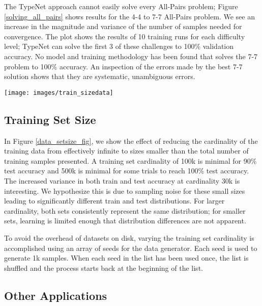 The TypeNet approach cannot easily solve every All-Pairs
problem; Figure \ref{solving_all_pairs} shows results for the 4-4 to 7-7 All-Pairs problem.
We see an increase in the magnitude and variance of the number of samples needed for convergence.  The plot shows the results of 10 training runs for each difficulty level; TypeNet can solve the first 3 of these challenges to 100\% validation accuracy.  No model and training methodology has been found that solves the 7-7 problem to 100\% accuracy.  An inspection of the errors made by the best 7-7 solution shows that they are systematic, unambiguous errors.


\begin{figure*}[!htb]
\centering
{}
  \texttt{[image: images/train\_sizedata]}
\endminipage\hfill
\caption{Training the TypeNet on 4-4 All Pairs with 100M samples drawn from a fixed-size training set.}
\label{data_setsize_fig}
\end{figure*}


\subsection{Training Set Size}

In Figure \ref{data_setsize_fig}, we show the effect of reducing the
cardinality of the training data from effectively infinite to sizes
smaller than the total number of training samples presented.  A training
set cardinality of 100k is minimal for 90\% test accuracy and 500k is
minimal for some trials to reach 100\% test accuracy.  The increased variance in both train and test accuracy at
cardinality 30k is interesting.  We hypothesize this is due to sampling
noise for these small sizes leading to significantly different train and
test distributions.  For larger cardinality, both sets consistently
represent the same distribution; for smaller sets, learning is
limited enough that distribution differences are not apparent.

To avoid the overhead of datasets on disk, varying the training set
cardinality is accomplished using an array of seeds for the data
generator.  Each seed is used to generate 1k samples.  When each seed in
the list has been used once, the list is shuffled and the process
starts back at the beginning of the list.

\subsection{Other Applications}


